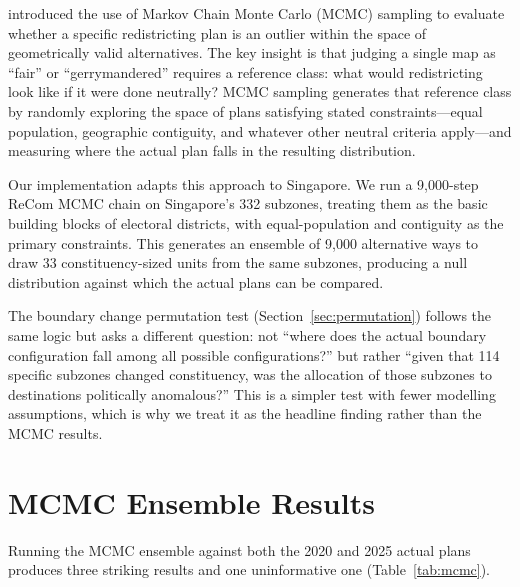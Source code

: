 \documentclass[12pt]{article}
\begin{document}
\citet{herschlag2020} introduced the use of Markov Chain Monte Carlo (MCMC) sampling to evaluate
whether a specific redistricting plan is an outlier within the space of geometrically valid
alternatives. The key insight is that judging a single map as ``fair'' or ``gerrymandered''
requires a reference class: what would redistricting look like if it were done neutrally? MCMC
sampling generates that reference class by randomly exploring the space of plans satisfying stated
constraints---equal population, geographic contiguity, and whatever other neutral criteria
apply---and measuring where the actual plan falls in the resulting distribution.

Our implementation adapts this approach to Singapore. We run a 9,000-step ReCom MCMC chain on
Singapore's 332 subzones, treating them as the basic building blocks of electoral districts, with
equal-population and contiguity as the primary constraints. This generates an ensemble of 9,000
alternative ways to draw 33 constituency-sized units from the same subzones, producing a null
distribution against which the actual plans can be compared.

The boundary change permutation test (Section~\ref{sec:permutation}) follows the same logic but
asks a different question: not ``where does the actual boundary configuration fall among all
possible configurations?'' but rather ``given that 114 specific subzones changed constituency, was
the allocation of those subzones to destinations politically anomalous?'' This is a simpler test
with fewer modelling assumptions, which is why we treat it as the headline finding rather than the
MCMC results.

\section{MCMC Ensemble Results}

Running the MCMC ensemble against both the 2020 and 2025 actual plans produces three striking
results and one uninformative one (Table~\ref{tab:mcmc}).
\end{document}

